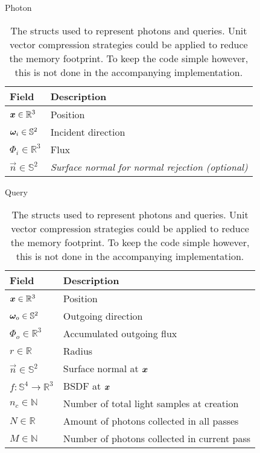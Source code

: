 \begin{table}
    \centering
    \begin{subtable}{.45\textwidth}
        \caption{Photon}
        \label{tab:photon_struct}
        \begin{tabular}{l p{4cm}}
            \textbf{Field} & \textbf{Description} \\
            \midrule
            $\bm{x} \in \mathbb{R}^3$ & Position \\
            ${\bm{\omega}_i} \in \mathbb{S}^2$ & Incident direction \\
            $\Phi_i \in \mathbb{R}^3$ & Flux \\
            $\vec{n} \in \mathbb{S}^2$ & \emph{Surface normal for normal rejection (optional)} \\
        \end{tabular}
    \end{subtable}%
    \begin{subtable}{.55\textwidth}
        \caption{Query}
        \label{tab:query_struct}
        \begin{tabular}{l p{5.5cm}}
            \textbf{Field} & \textbf{Description} \\
            \midrule
            $\bm{x} \in \mathbb{R}^3$ & Position \\
            ${\bm{\omega}_o} \in \mathbb{S}^2$ & Outgoing direction \\
            $\Phi_o \in \mathbb{R}^3$ & Accumulated outgoing flux \\
            $r \in \mathbb{R}$ & Radius \\
            $\vec{n} \in \mathbb{S}^2$ & Surface normal at $\bm{x}$ \\
            $f : \mathbb{S}^4 \to \mathbb{R}^3$ & BSDF at $\bm{x}$ \\
            $n_c \in \mathbb{N}$ & Number of total light samples at creation \\
            $N \in \mathbb{R}$ & Amount of photons collected in all passes \\
            $M \in \mathbb{N}$ & Number of photons collected in current pass \\
        \end{tabular}
    \end{subtable}
    \caption{The structs used to represent photons and queries. Unit vector compression strategies \parencite{cigolle2014} could be applied to reduce the memory footprint. To keep the code simple however, this is not done in the accompanying implementation.}
\end{table}

